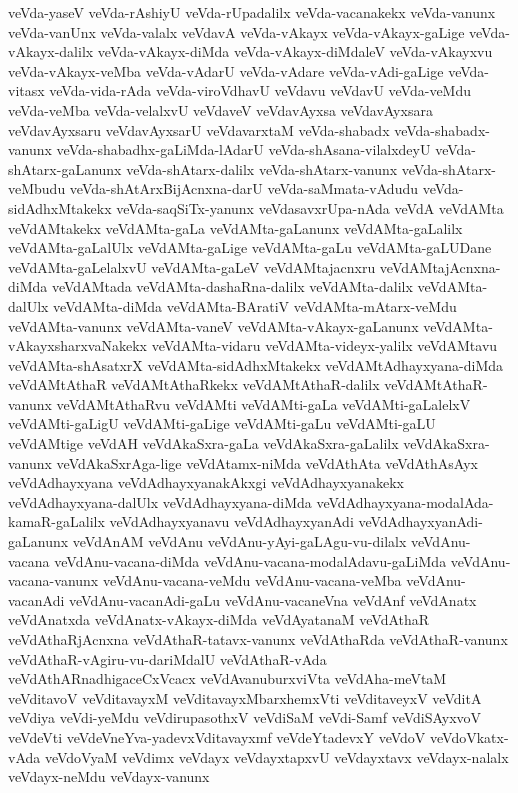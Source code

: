 {veVda-yaseV
veVda-rAshiyU
veVda-rUpadalilx
veVda-vacanakekx
veVda-vanunx
veVda-vanUnx
veVda-valalx
veVdavA
veVda-vAkayx
veVda-vAkayx-gaLige
veVda-vAkayx-dalilx
veVda-vAkayx-diMda
veVda-vAkayx-diMdaleV
veVda-vAkayxvu
veVda-vAkayx-veMba
veVda-vAdarU
veVda-vAdare
veVda-vAdi-gaLige
veVda-vitasx
veVda-vida-rAda
veVda-viroVdhavU
veVdavu
veVdavU
veVda-veMdu
veVda-veMba
veVda-velalxvU
veVdaveV
veVdavAyxsa
veVdavAyxsara
veVdavAyxsaru
veVdavAyxsarU
veVdavarxtaM
veVda-shabadx
veVda-shabadx-vanunx
veVda-shabadhx-gaLiMda-lAdarU
veVda-shAsana-vilalxdeyU
veVda-shAtarx-gaLanunx
veVda-shAtarx-dalilx
veVda-shAtarx-vanunx
veVda-shAtarx-veMbudu
veVda-shAtArxBijAcnxna-darU
veVda-saMmata-vAdudu
veVda-sidAdhxMtakekx
veVda-saqSiTx-yanunx
veVdasavxrUpa-nAda
veVdA
veVdAMta
veVdAMtakekx
veVdAMta-gaLa
veVdAMta-gaLanunx
veVdAMta-gaLalilx
veVdAMta-gaLalUlx
veVdAMta-gaLige
veVdAMta-gaLu
veVdAMta-gaLUDane
veVdAMta-gaLelalxvU
veVdAMta-gaLeV
veVdAMtajacnxru
veVdAMtajAcnxna-diMda
veVdAMtada
veVdAMta-dashaRna-dalilx
veVdAMta-dalilx
veVdAMta-dalUlx
veVdAMta-diMda
veVdAMta-BAratiV
veVdAMta-mAtarx-veMdu
veVdAMta-vanunx
veVdAMta-vaneV
veVdAMta-vAkayx-gaLanunx
veVdAMta-vAkayxsharxvaNakekx
veVdAMta-vidaru
veVdAMta-videyx-yalilx
veVdAMtavu
veVdAMta-shAsatxrX
veVdAMta-sidAdhxMtakekx
veVdAMtAdhayxyana-diMda
veVdAMtAthaR
veVdAMtAthaRkekx
veVdAMtAthaR-dalilx
veVdAMtAthaR-vanunx
veVdAMtAthaRvu
veVdAMti
veVdAMti-gaLa
veVdAMti-gaLalelxV
veVdAMti-gaLigU
veVdAMti-gaLige
veVdAMti-gaLu
veVdAMti-gaLU
veVdAMtige
veVdAH
veVdAkaSxra-gaLa
veVdAkaSxra-gaLalilx
veVdAkaSxra-vanunx
veVdAkaSxrAga-lige
veVdAtamx-niMda
veVdAthAta
veVdAthAsAyx
veVdAdhayxyana
veVdAdhayxyanakAkxgi
veVdAdhayxyanakekx
veVdAdhayxyana-dalUlx
veVdAdhayxyana-diMda
veVdAdhayxyana-modalAda-kamaR-gaLalilx
veVdAdhayxyanavu
veVdAdhayxyanAdi
veVdAdhayxyanAdi-gaLanunx
veVdAnAM
veVdAnu
veVdAnu-yAyi-gaLAgu-vu-dilalx
veVdAnu-vacana
veVdAnu-vacana-diMda
veVdAnu-vacana-modalAdavu-gaLiMda
veVdAnu-vacana-vanunx
veVdAnu-vacana-veMdu
veVdAnu-vacana-veMba
veVdAnu-vacanAdi
veVdAnu-vacanAdi-gaLu
veVdAnu-vacaneVna
veVdAnf
veVdAnatx
veVdAnatxda
veVdAnatx-vAkayx-diMda
veVdAyatanaM
veVdAthaR
veVdAthaRjAcnxna
veVdAthaR-tatavx-vanunx
veVdAthaRda
veVdAthaR-vanunx
veVdAthaR-vAgiru-vu-dariMdalU
veVdAthaR-vAda
veVdAthARnadhigaceCxVcacx
veVdAvanuburxviVta
veVdAha-meVtaM
veVditavoV
veVditavayxM
veVditavayxMbarxhemxVti
veVditaveyxV
veVditA
veVdiya
veVdi-yeMdu
veVdirupasothxV
veVdiSaM
veVdi-Samf
veVdiSAyxvoV
veVdeVti
veVdeVneYva-yadevxVditavayxmf
veVdeYtadevxY
veVdoV
veVdoVkatx-vAda
veVdoVyaM
veVdimx
veVdayx
veVdayxtapxvU
veVdayxtavx
veVdayx-nalalx
veVdayx-neMdu
veVdayx-vanunx
}
